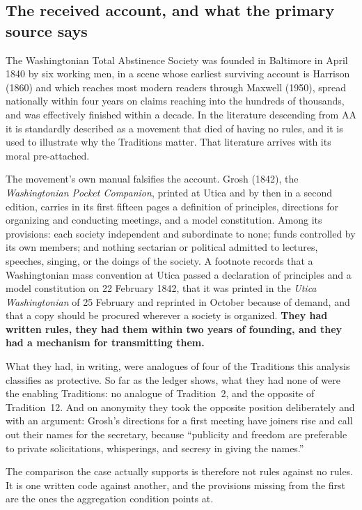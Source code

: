 \documentclass[11pt,a4paper]{article}
\begin{document}
\subsection{The received account, and what the primary source says}

The Washingtonian Total Abstinence Society was founded in Baltimore in April 1840
by six working men, in a scene whose earliest surviving account is Harrison (1860)
and which reaches most modern readers through Maxwell (1950), spread nationally within four years on claims reaching into
the hundreds of thousands, and was effectively finished within a decade. In the
literature descending from AA it is standardly described as a movement that died
of having no rules, and it is used to illustrate why the Traditions matter. That
literature arrives with its moral pre-attached.

The movement's own manual falsifies the account. Grosh (1842), the
\emph{Washingtonian Pocket Companion}, printed at Utica and by then in a second
edition, carries in its first fifteen pages a definition of principles, directions
for organizing and conducting meetings, and a model constitution. Among its
provisions: each society independent and subordinate to none; funds controlled by
its own members; and nothing sectarian or political admitted to lectures,
speeches, singing, or the doings of the society. A footnote records that a
Washingtonian mass convention at Utica passed a declaration of principles and a
model constitution on 22 February 1842, that it was printed in the \emph{Utica
Washingtonian} of 25 February and reprinted in October because of demand, and that
a copy should be procured wherever a society is organized. \textbf{They had
written rules, they had them within two years of founding, and they had a
mechanism for transmitting them.}

What they had, in writing, were analogues of four of the Traditions this analysis
classifies as protective. So far as the ledger shows, what they had none of were the enabling
Traditions: no analogue of Tradition~2, and the opposite of Tradition~12. And on anonymity they took the opposite position deliberately and with
an argument: Grosh's directions for a first meeting have joiners rise and call out
their names for the secretary, because ``publicity and freedom are preferable to
private solicitations, whisperings, and secresy in giving the names.''

The comparison the case actually supports is therefore not rules against no rules.
It is one written code against another, and the provisions missing from the first
are the ones the aggregation condition points at.
\end{document}
